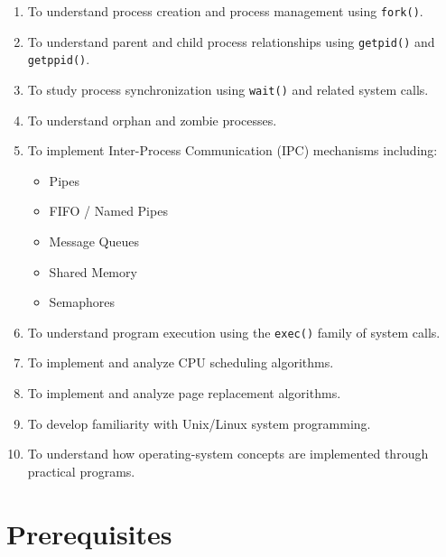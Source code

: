 \documentclass[12pt,a4paper]{report}
\begin{document}
\begin{enumerate}
    \item To understand process creation and process management using
    \texttt{fork()}.

    \item To understand parent and child process relationships using
    \texttt{getpid()} and \texttt{getppid()}.

    \item To study process synchronization using \texttt{wait()} and related
    system calls.

    \item To understand orphan and zombie processes.

    \item To implement Inter-Process Communication (IPC) mechanisms including:
    \begin{itemize}
        \item Pipes
        \item FIFO / Named Pipes
        \item Message Queues
        \item Shared Memory
        \item Semaphores
    \end{itemize}

    \item To understand program execution using the \texttt{exec()} family of
    system calls.

    \item To implement and analyze CPU scheduling algorithms.

    \item To implement and analyze page replacement algorithms.

    \item To develop familiarity with Unix/Linux system programming.

    \item To understand how operating-system concepts are implemented through
    practical programs.
\end{enumerate}


\chapter*{Prerequisites}
\end{document}
